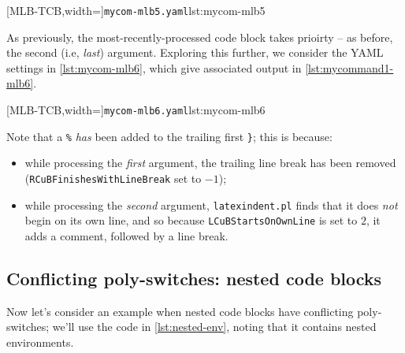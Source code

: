 	\begin{minipage}{.4\linewidth}
	\end{minipage}
    \hfill
	\begin{minipage}{.55\linewidth}
		[MLB-TCB,width=\linewidth]{\texttt{mycom-mlb5.yaml}}{lst:mycom-mlb5}
	\end{minipage}

    As previously, the most-recently-processed code block takes prioirty -- as before, the second (i.e, \emph{last}) argument. Exploring this
    further, we consider the YAML settings in \cref{lst:mycom-mlb6}, which give associated output in \cref{lst:mycommand1-mlb6}.
    
	\begin{minipage}{.4\linewidth}
	\end{minipage}
    \hfill
	\begin{minipage}{.55\linewidth}
		[MLB-TCB,width=\linewidth]{\texttt{mycom-mlb6.yaml}}{lst:mycom-mlb6}
	\end{minipage}

    Note that a \lstinline!%! \emph{has} been added to the trailing first \lstinline!}!; this is because:
    \begin{itemize}
      \item while processing the \emph{first} argument, the trailing line break has been removed (\texttt{RCuBFinishesWithLineBreak} set to $-1$);
      \item while processing the \emph{second} argument, \texttt{latexindent.pl} finds that it does \emph{not} begin on its own line, and so
        because \texttt{LCuBStartsOnOwnLine} is set to $2$, it adds a comment, followed by a line break.
    \end{itemize}

\subsection{Conflicting poly-switches: nested code blocks}
Now let's consider an example when nested code blocks have conflicting poly-switches; we'll use the code in \cref{lst:nested-env}, 
noting that it contains nested environments.

